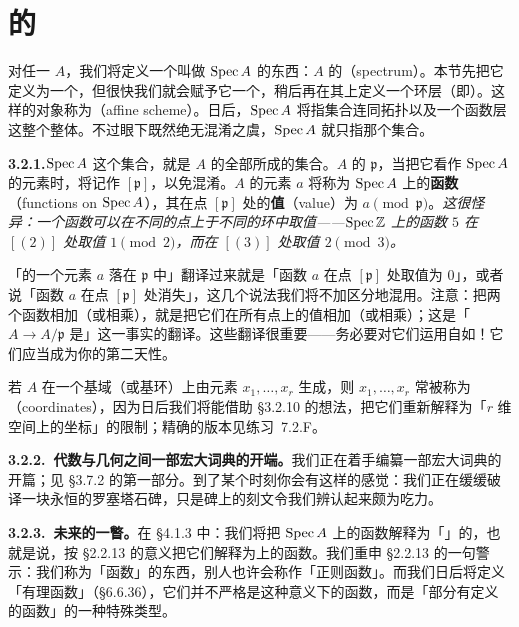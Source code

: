 

\section{\trAffineScheme{}的\trUnderlyingSet}

对任一\trRing{} $A$，我们将定义一个叫做 $\operatorname{Spec} A$ 的东西：$A$ 的\textbf{\trSpectrum}（spectrum）。本节先把它定义为一个\trSet，但很快我们就会赋予它一个\trTopology，稍后再在其上定义一个环层（即\trStructureSheaf）。这样的对象称为\textbf{\trAffineScheme}（affine scheme）。日后，$\operatorname{Spec} A$ 将指集合连同拓扑以及一个函数层这整个整体。不过眼下既然绝无混淆之虞，$\operatorname{Spec} A$ 就只指那个集合。

\textbf{3.2.1.}\quad $\operatorname{Spec} A$ 这个集合，就是 $A$ 的全部\trPrimeIdeal{}所成的集合。$A$ 的\trPrimeIdeal{} $\mathfrak{p}$，当把它看作 $\operatorname{Spec} A$ 的元素时，将记作 $[\mathfrak{p}]$，以免混淆。$A$ 的元素 $a$ 将称为 $\operatorname{Spec} A$ 上的\textbf{函数}（functions on $\operatorname{Spec} A$），其在点 $[\mathfrak{p}]$ 处的\textbf{值}（value）为 $a\pmod{\mathfrak{p}}$。\emph{这很怪异：一个函数可以在不同的点上于不同的环中取值——$\operatorname{Spec}\mathbb{Z}$ 上的函数 $5$ 在 $[(2)]$ 处取值 $1\pmod{2}$，而在 $[(3)]$ 处取值 $2\pmod{3}$。}

「\trRing{}的一个元素 $a$ 落在\trPrimeIdeal{} $\mathfrak{p}$ 中」翻译过来就是「函数 $a$ 在点 $[\mathfrak{p}]$ 处取值为 $0$」，或者说「函数 $a$ 在点 $[\mathfrak{p}]$ 处消失」，这几个说法我们将不加区分地混用。注意：把两个函数相加（或相乘），就是把它们在所有点上的值相加（或相乘）；这是「$A\to A/\mathfrak{p}$ 是\trRingMorphism」这一事实的翻译。这些翻译很重要——务必要对它们运用自如！它们应当成为你的第二天性。

若 $A$ 在一个基域（或基环）上由元素 $x_1,\dots,x_r$ 生成，则 $x_1,\dots,x_r$ 常被称为\textbf{\trCoordinate}（coordinates），因为日后我们将能借助 \S3.2.10 的想法，把它们重新解释为「$r$ 维空间上的坐标」的限制；精确的版本见练习~7.2.F。

\textbf{3.2.2.\ 代数与几何之间一部宏大词典的开端。}\quad 我们正在着手编纂一部宏大词典的开篇；见 \S3.7.2 的第一部分。到了某个时刻你会有这样的感觉：我们正在缓缓破译一块永恒的罗塞塔石碑，只是碑上的刻文令我们辨认起来颇为吃力。

\textbf{3.2.3.\ 未来的一瞥。}\quad 在 \S4.1.3 中：我们将把 $\operatorname{Spec} A$ 上的函数解释为「\trStructureSheaf」的\trGlobalSections，也就是说，按 \S2.2.13 的意义把它们解释为\trRingedSpace{}上的函数。我们重申 \S2.2.13 的一句警示：我们称为「函数」的东西，别人也许会称作「正则函数」。而我们日后将定义「有理函数」（\S6.6.36），它们并不严格是这种意义下的函数，而是「部分有定义的函数」的一种特殊类型。

